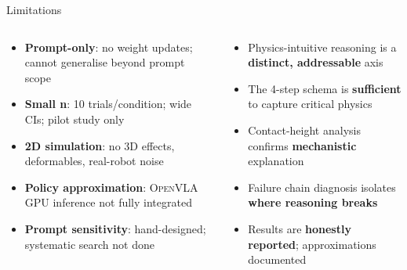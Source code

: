 \documentclass[aspectratio=169,10pt]{beamer}
\newcommand{\openvla}{\textsc{OpenVLA}}
\begin{document}
\begin{frame}{Limitations}
\begin{columns}[T]
\begin{tcolorbox}[colback=basered!10,colframe=basered,
                  title={\small Current Limitations},
                  left=4pt,right=4pt,top=3pt,bottom=3pt]
\small
\begin{itemize}
  \item \textbf{Prompt-only}: no weight updates; cannot generalise beyond prompt scope
  \item \textbf{Small n}: 10 trials/condition; wide CIs; pilot study only
  \item \textbf{2D simulation}: no 3D effects, deformables, real-robot noise
  \item \textbf{Policy approximation}: \openvla{} GPU inference not fully integrated
  \item \textbf{Prompt sensitivity}: hand-designed; systematic search not done
\end{itemize}
\end{tcolorbox}

\begin{tcolorbox}[colback=physgreen!10,colframe=physgreen,
                  title={\small What We Validated},
                  left=4pt,right=4pt,top=3pt,bottom=3pt]
\small
\begin{itemize}
  \item Physics-intuitive reasoning is a \textbf{distinct, addressable} axis
  \item The 4-step schema is \textbf{sufficient} to capture critical physics
  \item Contact-height analysis confirms \textbf{mechanistic} explanation
  \item Failure chain diagnosis isolates \textbf{where reasoning breaks}
  \item Results are \textbf{honestly reported}; approximations documented
\end{itemize}
\end{tcolorbox}
\end{columns}
\end{frame}
\end{document}
